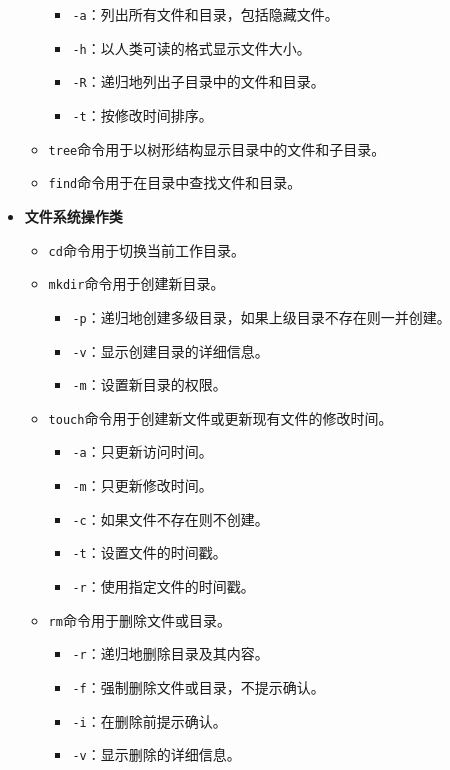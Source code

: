 \begin{itemize}
\begin{itemize}
\begin{itemize}
          \item \texttt{-a}：列出所有文件和目录，包括隐藏文件。
          \item \texttt{-h}：以人类可读的格式显示文件大小。
          \item \texttt{-R}：递归地列出子目录中的文件和目录。
          \item \texttt{-t}：按修改时间排序。
        \end{itemize}
      \item \texttt{tree}命令用于以树形结构显示目录中的文件和子目录。
      \item \texttt{find}命令用于在目录中查找文件和目录。
    \end{itemize}
  \item \textbf{文件系统操作类}
    \begin{itemize}
      \item \texttt{cd}命令用于切换当前工作目录。
      \item \texttt{mkdir}命令用于创建新目录。
        \begin{itemize}
          \item \texttt{-p}：递归地创建多级目录，如果上级目录不存在则一并创建。
          \item \texttt{-v}：显示创建目录的详细信息。
          \item \texttt{-m}：设置新目录的权限。
        \end{itemize}
      \item \texttt{touch}命令用于创建新文件或更新现有文件的修改时间。
        \begin{itemize}
          \item \texttt{-a}：只更新访问时间。
          \item \texttt{-m}：只更新修改时间。
          \item \texttt{-c}：如果文件不存在则不创建。
          \item \texttt{-t}：设置文件的时间戳。
          \item \texttt{-r}：使用指定文件的时间戳。
        \end{itemize}
      \item \texttt{rm}命令用于删除文件或目录。
        \begin{itemize}
          \item \texttt{-r}：递归地删除目录及其内容。
          \item \texttt{-f}：强制删除文件或目录，不提示确认。
          \item \texttt{-i}：在删除前提示确认。
          \item \texttt{-v}：显示删除的详细信息。

\end{itemize}
\end{itemize}
\end{itemize}
